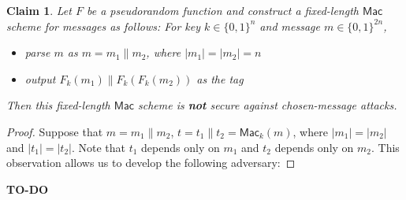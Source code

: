 \documentclass[12pt]{article}
\numberwithin{equation}{section}
\theoremstyle{plain}
\newtheorem{claim}{Claim}
\newcommand{\set}[1]{\{ #1 \}}
\newcommand{\algo}[1]{\mathsf{#1}}
\newcommand{\mac}{\algo{Mac}}
\begin{document}
\begin{claim}
Let $F$ be a pseudorandom function
and construct a fixed-length $\mac$ scheme for messages as follows:
For key $k \in \set{ 0, 1 }^n$ and message $m \in \set{ 0, 1 }^{2n}$,
\begin{itemize}
    \item parse $m$ as $m = m_1 \| m_2$, where $|m_1| = |m_2| = n$
    \item output $F_k(m_1) \| F_k(F_k(m_2))$ as the tag
\end{itemize}
Then this fixed-length $\mac$ scheme is \textbf{not} secure against chosen-message attacks.
\end{claim}
\begin{proof}
Suppose that $m = m_1 \| m_2$, $t = t_1 \| t_2 = \mac_k(m)$,
where $|m_1| = |m_2|$ and $|t_1| = |t_2|$.
Note that $t_1$ depends only on $m_1$ and $t_2$ depends only on $m_2$.
This observation allows us to develop the following adversary:
\end{proof}

\textbf{TO-DO}
\end{document}
